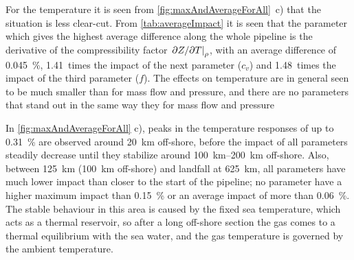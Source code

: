 % 

For the temperature it is seen from \cref{fig:maxAndAverageForAll}~c) that the situation is less clear-cut. From \cref{tab:averageImpact} it is seen that the parameter which gives the highest average difference along the whole pipeline is the derivative of the compressibility factor $\eval{\partial Z/\partial T}_\rho$, with an average difference of \SI{0.045}{\percent}, 1.41~times the impact of the next parameter ($c_v$) and 1.48~times the impact of the third parameter ($f$). The effects on temperature are in general seen to be much smaller than for mass flow and pressure, and there are no parameters that stand out in the same way they for mass flow and pressure

In \cref{fig:maxAndAverageForAll} c), peaks in the temperature responses of up to \SI{0.31}{\percent} are observed around \SI{20}{\kilo\meter} off-shore, before the impact of all parameters steadily decrease until they stabilize around \SIrange{100}{200}{\kilo\meter} off-shore. Also, between \SI{125}{\kilo\meter} (\SI{100}{\kilo\meter} off-shore) and landfall at \SI{625}{\kilo\meter}, all parameters have much lower impact than closer to the start of the pipeline; no parameter have a higher maximum impact than \SI{0.15}{\percent} or an average impact of more than \SI{0.06}{\percent}. %
The stable behaviour in this area is caused by the fixed sea temperature, which acts as a thermal reservoir, so after a long off-shore section the gas comes to a thermal equilibrium with the sea water, and the gas temperature is governed by the ambient temperature.

